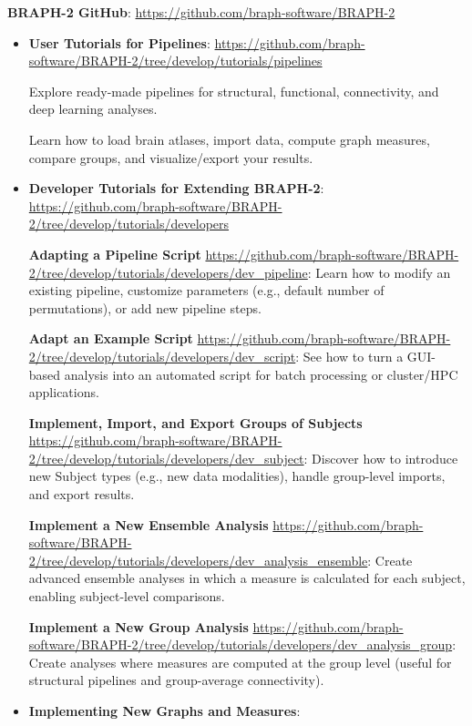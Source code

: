 \documentclass[justified]{tufte-handout}
\begin{document}
\textbf{BRAPH-2 GitHub}: \url{https://github.com/braph-software/BRAPH-2}

\begin{itemize}

\item \textbf{User Tutorials for Pipelines}: \url{https://github.com/braph-software/BRAPH-2/tree/develop/tutorials/pipelines}

Explore ready-made pipelines for structural, functional, connectivity, and deep learning analyses.

Learn how to load brain atlases, import data, compute graph measures, compare groups, and visualize/export your results.


\item \textbf{Developer Tutorials for Extending BRAPH-2}: \url{https://github.com/braph-software/BRAPH-2/tree/develop/tutorials/developers}

\textbf{Adapting a Pipeline Script} \url{https://github.com/braph-software/BRAPH-2/tree/develop/tutorials/developers/dev_pipeline}:  
Learn how to modify an existing pipeline, customize parameters (e.g., default number of permutations), or add new pipeline steps.

\textbf{Adapt an Example Script} \url{https://github.com/braph-software/BRAPH-2/tree/develop/tutorials/developers/dev_script}:  
See how to turn a GUI-based analysis into an automated script for batch processing or cluster/HPC applications.

\textbf{Implement, Import, and Export Groups of Subjects} \url{https://github.com/braph-software/BRAPH-2/tree/develop/tutorials/developers/dev_subject}:  
Discover how to introduce new Subject types (e.g., new data modalities), handle group-level imports, and export results.

\textbf{Implement a New Ensemble Analysis} \url{https://github.com/braph-software/BRAPH-2/tree/develop/tutorials/developers/dev_analysis_ensemble}:  
Create advanced ensemble analyses in which a measure is calculated for each subject, enabling subject-level comparisons.

\textbf{Implement a New Group Analysis} \url{https://github.com/braph-software/BRAPH-2/tree/develop/tutorials/developers/dev_analysis_group}:  
Create analyses where measures are computed at the group level (useful for structural pipelines and group-average connectivity).

\item \textbf{Implementing New Graphs and Measures}: 


\end{itemize}
\end{document}

